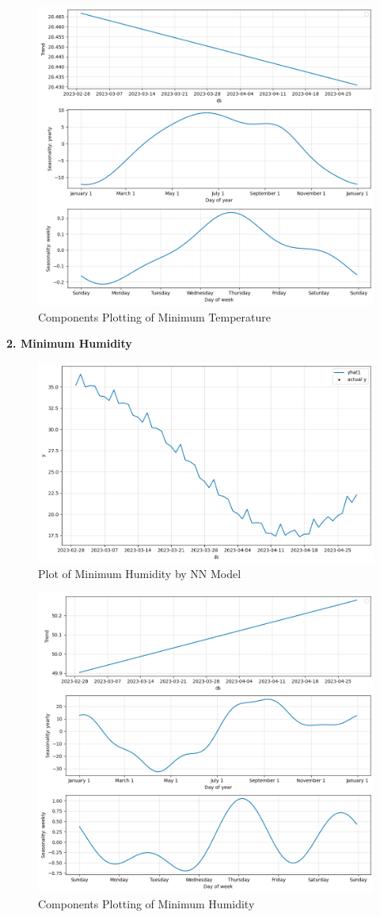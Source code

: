  \begin{figure}[hbt!]
  \centering
  \includegraphics[width=0.7\linewidth]{images/outputs/neural temp_min trend.png}
  \caption{Components Plotting of Minimum Temperature}
\end{figure}



\textbf{2. Minimum Humidity}
\begin{figure}[hbt!]
  \centering
  \includegraphics[width=0.7\linewidth]{images/outputs/neural hum_min.png}
  \caption{Plot of Minimum Humidity by NN Model}
\end{figure}


 \begin{figure}[hbt!]
  \centering
  \includegraphics[width=0.7\linewidth]{images/outputs/neural hum_min trend.png}
  \caption{Components Plotting of Minimum Humidity}
\end{figure}

